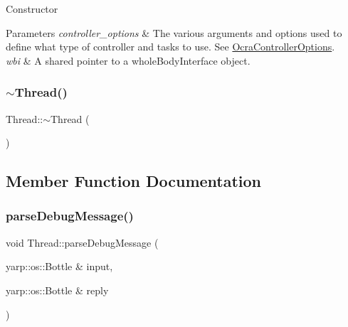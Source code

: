 Constructor 
\begin{DoxyParams}{Parameters}
{\em controller\+\_\+options} & The various arguments and options used to define what type of controller and tasks to use. See \hyperlink{classOcraControllerOptions}{Ocra\+Controller\+Options}. \\
\hline
{\em wbi} & A shared pointer to a whole\+Body\+Interface object. \\
\hline
\end{DoxyParams}
\hypertarget{classThread_a37d9edd3a1a776cbc27dedff949c9726}{}\label{classThread_a37d9edd3a1a776cbc27dedff949c9726} 
\subsubsection{\texorpdfstring{$\sim$\+Thread()}{~Thread()}}
{\footnotesize\ttfamily Thread\+::$\sim$\+Thread (\begin{DoxyParamCaption}{ }\end{DoxyParamCaption})\hspace{0.3cm}{\ttfamily [virtual]}}



\subsection{Member Function Documentation}
\hypertarget{classThread_a6ce5ef9684cb2793be85e7402ad672f0}{}\label{classThread_a6ce5ef9684cb2793be85e7402ad672f0} 
\subsubsection{\texorpdfstring{parse\+Debug\+Message()}{parseDebugMessage()}}
{\footnotesize\ttfamily void Thread\+::parse\+Debug\+Message (\begin{DoxyParamCaption}\item[{yarp\+::os\+::\+Bottle \&}]{input,  }\item[{yarp\+::os\+::\+Bottle \&}]{reply }\end{DoxyParamCaption})\hspace{0.3cm}{\ttfamily [private]}}

\hypertarget{classThread_ae21029d250ac7c720f2411eab71a9414}{}\label{classThread_ae21029d250ac7c720f2411eab71a9414} 
